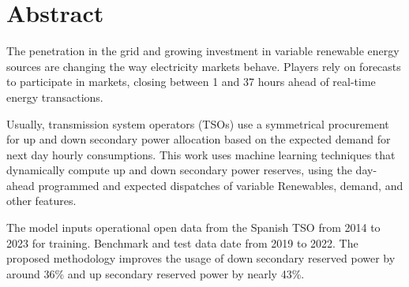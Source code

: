 \chapter{Abstract}
\justifying
The penetration in the grid and growing investment in variable renewable energy sources are changing the way electricity markets behave. Players rely on forecasts to participate in markets, closing between 1 and 37 hours ahead of real-time energy transactions. \par
Usually, transmission system operators (TSOs) use a symmetrical procurement for up and down secondary power allocation based on the expected demand for next day hourly consumptions. This work uses machine learning techniques that dynamically compute up and down secondary power reserves, using the day-ahead programmed and expected dispatches of variable Renewables, demand, and other  features.\par
The model inputs operational open data from the Spanish TSO from 2014 to 2023 for training. Benchmark and test data date from 2019 to 2022. The proposed methodology improves the usage of down secondary reserved power by around 36\% and up secondary reserved power by nearly 43\%.\par



\vspace{0.5cm} %

